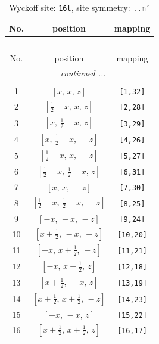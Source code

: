 \documentclass[fleqn,8pt]{jsarticle}
\begin{document}
\renewcommand{\arraystretch}{1.2}
\begin{longtable}{ccc}
\caption{Wyckoff site: {\tt 16t}, site symmetry: {\tt ..m'}}
 \\
 \hline \hline
No. & position & mapping \\ \hline \endfirsthead

\multicolumn{2}{l}{\tablename\ \thetable{}} \\
 \hline \hline
No. & position & mapping \\ \hline \endhead

 \hline \hline
\multicolumn{2}{r}{\footnotesize\it continued ...} \\ \endfoot

 \hline \hline
\multicolumn{2}{r}{} \\ \endlastfoot

1 & $\left[ x,\, x,\, z \right]$ & {\tt [1,32]} \\ \hline
2 & $\left[ \frac{1}{2} - x,\, x,\, z \right]$ & {\tt [2,28]} \\ \hline
3 & $\left[ x,\, \frac{1}{2} - x,\, z \right]$ & {\tt [3,29]} \\ \hline
4 & $\left[ x,\, \frac{1}{2} - x,\, - z \right]$ & {\tt [4,26]} \\ \hline
5 & $\left[ \frac{1}{2} - x,\, x,\, - z \right]$ & {\tt [5,27]} \\ \hline
6 & $\left[ \frac{1}{2} - x,\, \frac{1}{2} - x,\, z \right]$ & {\tt [6,31]} \\ \hline
7 & $\left[ x,\, x,\, - z \right]$ & {\tt [7,30]} \\ \hline
8 & $\left[ \frac{1}{2} - x,\, \frac{1}{2} - x,\, - z \right]$ & {\tt [8,25]} \\ \hline
9 & $\left[ - x,\, - x,\, - z \right]$ & {\tt [9,24]} \\ \hline
10 & $\left[ x + \frac{1}{2},\, - x,\, - z \right]$ & {\tt [10,20]} \\ \hline
11 & $\left[ - x,\, x + \frac{1}{2},\, - z \right]$ & {\tt [11,21]} \\ \hline
12 & $\left[ - x,\, x + \frac{1}{2},\, z \right]$ & {\tt [12,18]} \\ \hline
13 & $\left[ x + \frac{1}{2},\, - x,\, z \right]$ & {\tt [13,19]} \\ \hline
14 & $\left[ x + \frac{1}{2},\, x + \frac{1}{2},\, - z \right]$ & {\tt [14,23]} \\ \hline
15 & $\left[ - x,\, - x,\, z \right]$ & {\tt [15,22]} \\ \hline
16 & $\left[ x + \frac{1}{2},\, x + \frac{1}{2},\, z \right]$ & {\tt [16,17]} \\
\end{longtable}
\end{document}
